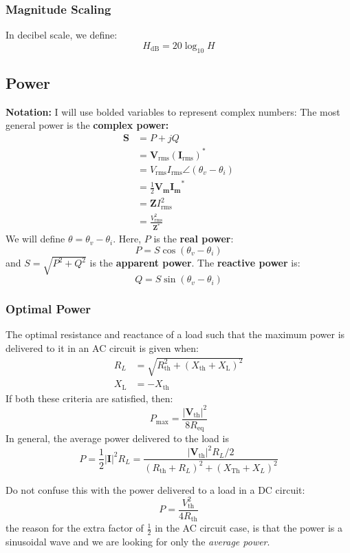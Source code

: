 \documentclass{article}
\begin{document}
\subsubsection{Magnitude Scaling}
In decibel scale, we define:
\begin{equation}
    H_\text{dB} = 20\log_{10}H
\end{equation}
\subsection{Power}
\textbf{Notation:} I will use bolded variables to represent complex numbers: The most general power is the \textbf{complex power:}
\begin{align}
    \bm{S} &= P + jQ \\
    &= \bm{V}_\text{rms}\left(\bm{I}_\text{rms}\right)^* \\ 
    &= V_\text{rms}I_\text{rms} \angle (\theta_v-\theta_i) \\ 
    &= \frac{1}{2}\bm{V_m}\bm{I_m}^* \\ 
    &= \bm{Z}I_\text{rms}^2 \\ 
    &= \frac{V_\text{rms}^2}{\bm{Z}^*}
\end{align}
We will define $\theta=\theta_v-\theta_i$. Here, $P$ is the \textbf{real power}:
\begin{equation}
    P = S\cos(\theta_v-\theta_i)
\end{equation}
and $S=\sqrt{P^2+Q^2}$ is the \textbf{apparent power}. The \textbf{reactive power} is:
\begin{equation}
    Q = S\sin(\theta_v-\theta_i)
\end{equation}
\subsubsection{Optimal Power}
The optimal resistance and reactance of a load such that the maximum power is delivered to it in an AC circuit is given when:
\begin{align}
    R_L &= \sqrt{R_\text{th}^2 + (X_\text{th}+X_\text{L})^2} \\ 
    X_\text{L} &= - X_\text{th}
\end{align}
If both these criteria are satisfied, then:
\begin{equation}
    P_\text{max} = \frac{|\bm{V}_\text{th}|^2}{8R_\text{eq}}
\end{equation}
In general, the average power delivered to the load is
\begin{equation}
    P = \frac{1}{2}|\bm{I}|^2 R_L = \frac{|\bm{V}_\text{th}|^2R_L/2}{(R_\text{th}+R_L)^2+(X_\text{Th}+X_L)^2}
\end{equation}
\begin{warning}
    Do not confuse this with the power delivered to a load in a DC circuit:
    \begin{equation}
        P = \frac{V_\text{th}^2}{4R_\text{th}}
    \end{equation}
    the reason for the extra factor of $\frac{1}{2}$ in the AC circuit case, is that the power is a sinusoidal wave and we are looking for only the \textit{average power}.
\end{warning}
\end{document}
